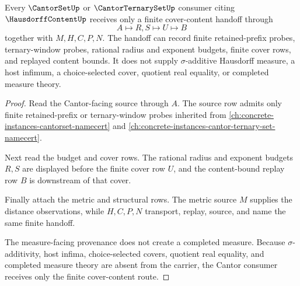 \begin{theorem}
\label{thm:hausdorff-content-cantor-cover-handoff}
Every $\CantorSetUp$ or $\CantorTernarySetUp$ consumer citing $\HausdorffContentUp$ receives only a finite cover-content handoff through
$$
A \longmapsto R,S \longmapsto U \longmapsto B
$$
together with $M,H,C,P,N$. The handoff can record finite retained-prefix probes, ternary-window probes, rational radius and exponent budgets, finite cover rows, and replayed content bounds. It does not supply $\sigma$-additive Hausdorff measure, a host infimum, a choice-selected cover, quotient real equality, or completed measure theory.
\end{theorem}
\begin{proof}
Read the Cantor-facing source through $A$. The source row admits only finite retained-prefix or ternary-window probes inherited from \autoref{ch:concrete-instances-cantorset-namecert} and \autoref{ch:concrete-instances-cantor-ternary-set-namecert}.

Next read the budget and cover rows. The rational radius and exponent budgets $R,S$ are displayed before the finite cover row $U$, and the content-bound replay row $B$ is downstream of that cover.

Finally attach the metric and structural rows. The metric source $M$ supplies the distance observations, while $H,C,P,N$ transport, replay, source, and name the same finite handoff.

The measure-facing provenance does not create a completed measure. Because $\sigma$-additivity, host infima, choice-selected covers, quotient real equality, and completed measure theory are absent from the carrier, the Cantor consumer receives only the finite cover-content route.
\end{proof}


\begin{closurestatus}{\HausdorffContentUp}
  \theoryclosure{\seedClosure}
  \formalstatus{\unformalizedV}
\end{closurestatus}
